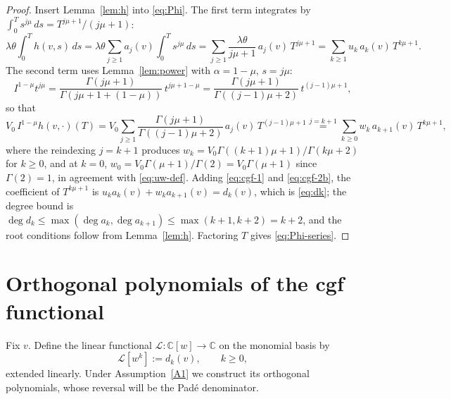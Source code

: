 \documentclass[11pt]{article}
\newcommand{\C}{\mathbb{C}}
\newcommand{\Ico}{I^{1-\mu}}
\newcommand{\Lc}{\mathcal{L}}
\begin{document}
\begin{proof}
Insert Lemma~\ref{lem:h} into \eqref{eq:Phi}. The first term integrates by
$\int_0^T s^{j\mu}\,ds=T^{j\mu+1}/(j\mu+1)$:
\begin{equation}\label{eq:cgf-1}
\lambda\theta\!\int_0^T h(v,s)\,ds
=\lambda\theta\sum_{j\ge1}a_j(v)\int_0^T s^{j\mu}\,ds
=\sum_{j\ge1}\frac{\lambda\theta}{j\mu+1}\,a_j(v)\,T^{j\mu+1}
=\sum_{k\ge1}u_k\,a_k(v)\,T^{k\mu+1}.
\end{equation}
The second term uses Lemma~\ref{lem:power} with $\alpha=1-\mu$, $s=j\mu$:
\begin{equation}\label{eq:cgf-2a}
\Ico t^{j\mu}=\frac{\Gamma(j\mu+1)}{\Gamma(j\mu+1+(1-\mu))}\,
t^{j\mu+1-\mu}=\frac{\Gamma(j\mu+1)}{\Gamma((j-1)\mu+2)}\,t^{(j-1)\mu+1},
\end{equation}
so that
\begin{equation}\label{eq:cgf-2b}
V_0\,\Ico h(v,\cdot)(T)
=V_0\sum_{j\ge1}\frac{\Gamma(j\mu+1)}{\Gamma((j-1)\mu+2)}\,a_j(v)\,
T^{(j-1)\mu+1}
\overset{j=k+1}{=}\sum_{k\ge0}w_k\,a_{k+1}(v)\,T^{k\mu+1},
\end{equation}
where the reindexing $j=k+1$ produces
$w_k=V_0\Gamma((k+1)\mu+1)/\Gamma(k\mu+2)$ for $k\ge0$, and at $k=0$,
$w_0=V_0\Gamma(\mu+1)/\Gamma(2)=V_0\Gamma(\mu+1)$ since $\Gamma(2)=1$, in
agreement with \eqref{eq:uw-def}. Adding \eqref{eq:cgf-1} and
\eqref{eq:cgf-2b}, the coefficient of $T^{k\mu+1}$ is
$u_k a_k(v)+w_k a_{k+1}(v)=d_k(v)$, which is \eqref{eq:dk}; the degree bound
is $\deg d_k\le\max(\deg a_k,\deg a_{k+1})\le\max(k+1,k+2)=k+2$, and the root
conditions follow from Lemma~\ref{lem:h}. Factoring $T$ gives
\eqref{eq:Phi-series}.
\end{proof}

\section{Orthogonal polynomials of the cgf functional}\label{sec:op}

Fix $v$. Define the linear functional $\Lc:\C[w]\to\C$ on the monomial basis
by
\begin{equation}\label{eq:L-def}
\Lc[w^{k}]:=d_k(v),\qquad k\ge0,
\end{equation}
extended linearly. Under Assumption~\ref{A1} we construct its orthogonal
polynomials, whose reversal will be the Pad\'e denominator.
\end{document}
